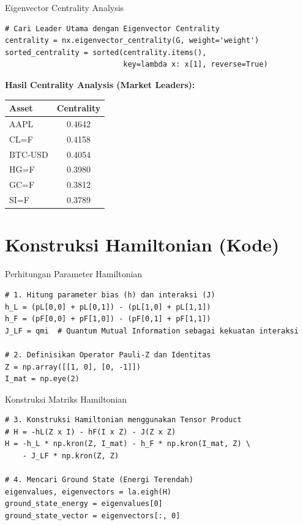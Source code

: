 \documentclass[aspectratio=169]{beamer}
\begin{document}
\begin{frame}[fragile]{Eigenvector Centrality Analysis}
\begin{lstlisting}
# Cari Leader Utama dengan Eigenvector Centrality
centrality = nx.eigenvector_centrality(G, weight='weight')
sorted_centrality = sorted(centrality.items(), 
                           key=lambda x: x[1], reverse=True)
\end{lstlisting}

\vspace{0.3cm}

\textbf{Hasil Centrality Analysis (Market Leaders):}
\begin{table}
    \centering
    \begin{tabular}{lc}
        \toprule
        \textbf{Asset} & \textbf{Centrality} \\
        \midrule
        AAPL & 0.4642 \\
        CL=F & 0.4158 \\
        BTC-USD & 0.4054 \\
        HG=F & 0.3980 \\
        GC=F & 0.3812 \\
        SI=F & 0.3789 \\
        \bottomrule
    \end{tabular}
\end{table}
\end{frame}

\section{Konstruksi Hamiltonian (Kode)}

\begin{frame}[fragile]{Perhitungan Parameter Hamiltonian}
\begin{lstlisting}
# 1. Hitung parameter bias (h) dan interaksi (J)
h_L = (pL[0,0] + pL[0,1]) - (pL[1,0] + pL[1,1])
h_F = (pF[0,0] + pF[1,0]) - (pF[0,1] + pF[1,1])
J_LF = qmi  # Quantum Mutual Information sebagai kekuatan interaksi

# 2. Definisikan Operator Pauli-Z dan Identitas
Z = np.array([[1, 0], [0, -1]])
I_mat = np.eye(2)
\end{lstlisting}
\end{frame}

\begin{frame}[fragile]{Konstruksi Matriks Hamiltonian}
\begin{lstlisting}
# 3. Konstruksi Hamiltonian menggunakan Tensor Product
# H = -hL(Z x I) - hF(I x Z) - J(Z x Z)
H = -h_L * np.kron(Z, I_mat) - h_F * np.kron(I_mat, Z) \
    - J_LF * np.kron(Z, Z)

# 4. Mencari Ground State (Energi Terendah)
eigenvalues, eigenvectors = la.eigh(H)
ground_state_energy = eigenvalues[0]
ground_state_vector = eigenvectors[:, 0]
\end{lstlisting}
\end{frame}
\end{document}
